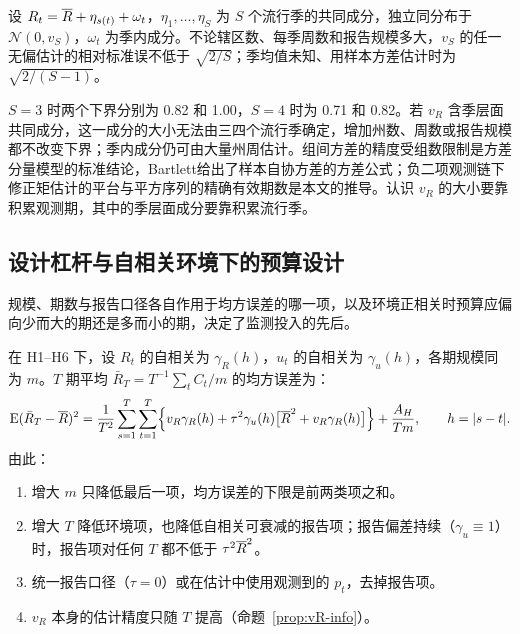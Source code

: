 \begin{corollary}[季层面成分]
\label{cor:season}
设 $R_t=\overline{R}+\eta_{s(t)}+\omega_t$，$\eta_1,\dots,\eta_S$ 为 $S$ 个流行季的共同成分，独立同分布于 $\mathcal N(0,v_S)$，$\omega_t$ 为季内成分。不论辖区数、每季周数和报告规模多大，$v_S$ 的任一无偏估计的相对标准误不低于 $\sqrt{2/S}$；季均值未知、用样本方差估计时为 $\sqrt{2/(S-1)}$。
\end{corollary}

$S=3$ 时两个下界分别为 0.82 和 1.00，$S=4$ 时为 0.71 和 0.82。若 $v_R$ 含季层面共同成分，这一成分的大小无法由三四个流行季确定，增加州数、周数或报告规模都不改变下界；季内成分仍可由大量州周估计。组间方差的精度受组数限制是方差分量模型的标准结论\citep{searle1992variance, cochran1977sampling}，Bartlett\citep{bartlett1946theoretical}给出了样本自协方差的方差公式；负二项观测链下修正矩估计的平台与平方序列的精确有效期数是本文的推导。认识 $v_R$ 的大小要靠积累观测期，其中的季层面成分要靠积累流行季。

\subsection{设计杠杆与自相关环境下的预算设计}
\label{sec:r3-levers}
\label{sec:r3-design}

规模、期数与报告口径各自作用于均方误差的哪一项，以及环境正相关时预算应偏向少而大的期还是多而小的期，决定了监测投入的先后。

\begin{proposition}[规模、期数与报告标准化的分工]
\label{prop:levers}
在 H1--H6 下，设 $R_t$ 的自相关为 $\gamma_R(h)$，$u_t$ 的自相关为 $\gamma_u(h)$，各期规模同为 $m$。$T$ 期平均 $\bar R_T=T^{-1}\sum_t C_t/m$ 的均方误差为：
\begin{equation}
  \operatorname{E}(\bar R_T-\overline{R})^2=\frac{1}{T^2}\sum_{s=1}^{T}\sum_{t=1}^{T}\Bigl\{v_R\gamma_R(h)+\tau^2\gamma_u(h)\bigl[\overline{R}^2+v_R\gamma_R(h)\bigr]\Bigr\}+\frac{A_H}{Tm},\qquad h=|s-t|.
  \label{eq:r3-levers}
\end{equation}
由此：
\begin{enumerate}[label=(\roman*)]
  \item 增大 $m$ 只降低最后一项，均方误差的下限是前两类项之和。
  \item 增大 $T$ 降低环境项，也降低自相关可衰减的报告项；报告偏差持续（$\gamma_u\equiv1$）时，报告项对任何 $T$ 都不低于 $\tau^2\overline{R}^2$。
  \item 统一报告口径（$\tau=0$）或在估计中使用观测到的 $p_t$，去掉报告项。
  \item $v_R$ 本身的估计精度只随 $T$ 提高（命题~\ref{prop:vR-info}）。
\end{enumerate}
\end{proposition}

